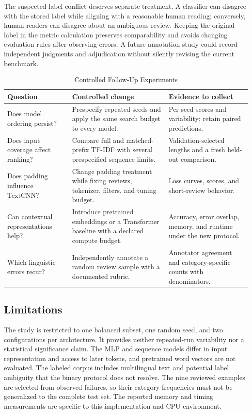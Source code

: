 The suspected label conflict deserves separate treatment. A classifier can disagree with the stored label while aligning with a reasonable human reading; conversely, human readers can disagree about an ambiguous review. Keeping the original label in the metric calculation preserves comparability and avoids changing evaluation rules after observing errors. A future annotation study could record independent judgments and adjudication without silently revising the current benchmark.


\begin{table}[tbp]
\fontsize{9}{10.2}\selectfont
\centering
\caption{Controlled Follow-Up Experiments}
\label{tab:future}
\renewcommand{\arraystretch}{1.10}\setlength{\tabcolsep}{4pt}
\begin{tabularx}{\linewidth}{@{}P{30mm}P{54mm}Y@{}}
\toprule
Question & Controlled change & Evidence to collect \\ \midrule
Does model ordering persist? & Prespecify repeated seeds and apply the same search budget to every model. & Per-seed scores and variability; retain paired predictions. \\
Does input coverage affect ranking? & Compare full and matched-prefix TF-IDF with several prespecified sequence limits. & Validation-selected lengths and a fresh held-out comparison. \\
Does padding influence TextCNN? & Change padding treatment while fixing reviews, tokenizer, filters, and tuning budget. & Loss curves, scores, and short-review behavior. \\
Can contextual representations help? & Introduce pretrained embeddings or a Transformer baseline with a declared compute budget. & Accuracy, error overlap, memory, and runtime under the new protocol. \\
Which linguistic errors recur? & Independently annotate a random review sample with a documented rubric. & Annotator agreement and category-specific counts with denominators. \\
\bottomrule
\end{tabularx}
\end{table}

\subsection{Limitations}
The study is restricted to one balanced subset, one random seed, and two configurations per architecture. It provides neither repeated-run variability nor a statistical significance claim. The MLP and sequence models differ in input representation and access to later tokens, and pretrained word vectors are not evaluated. The labeled corpus includes multilingual text and potential label ambiguity that the binary protocol does not resolve. The nine reviewed examples are selected from observed failures, so their category frequencies must not be generalized to the complete test set. The reported memory and timing measurements are specific to this implementation and CPU environment.


